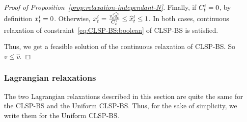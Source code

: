 \begin{proof}[Proof of Proposition~\cref{prop:relaxation-independant-N}]
Finally, if $C_t^i=0$, by definition $x_t^i=0$. Otherwise, $x_t^i=\frac{v_t^i\widehat{q}_t^i}{C_t^i}\le\widehat{x}_t^i\le 1$. In both cases, continuous relaxation of constraint~\eqref{eq:CLSP-BS:boolean} of CLSP-BS is satisfied.

Thus, we get a feasible solution of the continuous relaxation of CLSP-BS. So $v \le \widehat{v}$.
\end{proof}



\subsubsection{Lagrangian relaxations}


The two Lagrangian relaxations described in this section are quite the same for the CLSP-BS and the Uniform CLSP-BS. Thus, for the sake of simplicity, we write them for the Uniform CLSP-BS.


